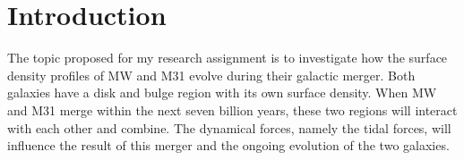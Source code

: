 \documentclass[linenumbers,trackchanges]{aastex7}
\begin{document}
\author[gname='Matthew', sname='Gilles']{Matthew Gilles}




\section{Introduction}

The topic proposed for my research assignment is to investigate how the
surface density profiles of MW and M31 evolve during their galactic merger.
Both galaxies have a disk and bulge region with its own surface density. When
MW and M31 merge within the next seven billion years, these two regions will
interact with each other and combine. The dynamical forces, namely the tidal
forces, will influence the result of this merger and the ongoing evolution
of the two galaxies.
\end{document}
